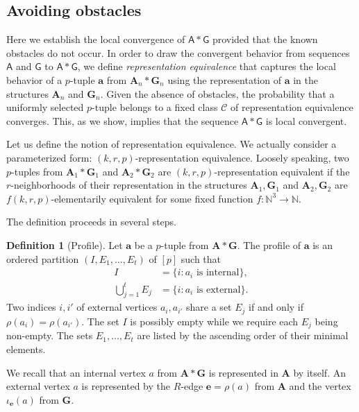 \documentclass[11pt]{article}
\theoremstyle{plain}
\theoremstyle{definition}
\newtheorem{definition}{Definition}
\theoremstyle{remark}
\newcommand{\N}{\mathbb{N}}
\newcommand{\str}[1]{\mathbf{#1}}
\newcommand{\strseq}[1]{{\boldsymbol{\mathsf{#1}}}}
\newcommand{\tpl}[1]{{\bm{#1}}}
\begin{document}
\subsection{Avoiding obstacles}\label{ssec:avoiding_obstacles}

Here we establish the local convergence of $\strseq{A}*\strseq{G}$ provided that the known obstacles do not occur.
In order to draw the convergent behavior from sequences $\strseq{A}$ and $\strseq{G}$ to $\strseq{A}*\strseq{G}$, we define \emph{representation equivalence} that captures the local behavior of a $p$-tuple $\tpl{a}$ from $\str{A}_n * \str{G}_n$ using the representation of $\tpl{a}$ in the structures $\str{A}_n$ and $\str{G}_n$.
Given the absence of obstacles, the probability that a uniformly selected $p$-tuple belongs to a fixed class $\mathcal{C}$ of representation equivalence converges.
This, as we show, implies that the sequence $\strseq{A}*\strseq{G}$ is local convergent.

Let us define the notion of representation equivalence.
We actually consider a parameterized form: $(k,r,p)$-representation equivalence.
Loosely speaking, two $p$-tuples from $\str{A}_1*\str{G}_1$ and $\str{A}_2*\str{G}_2$ are $(k,r,p)$-representation equivalent if the $r$-neighborhoods of their representation in the structures $\str{A}_1, \str{G}_1$ and $\str{A}_2, \str{G}_2$ are $f(k,r,p)$-elementarily equivalent for some fixed function $f: \N^3 \to \N$.

The definition proceeds in several steps.

\begin{definition}[Profile]
    Let $\tpl{a}$ be a $p$-tuple from $\str{A}*\str{G}$.
    The profile of $\tpl{a}$ is an ordered partition $(I, E_1, \dots, E_t)$ of $[p]$ such that
    \begin{align*}
        I                   &= \{i : a_i\text{ is internal}\}
        , \\
        \bigcup_{j=1}^t E_j &= \{i : a_i\text{ is external}\}
        .
    \end{align*}
    Two indices $i,i'$ of external vertices $a_i, a_{i'}$ share a set $E_j$ if and only if $\rho(a_i) = \rho(a_{i'})$.
    The set $I$ is possibly empty while we require each $E_j$ being non-empty.
    The sets $E_1, \dots, E_t$ are listed by the ascending order of their minimal elements.
\end{definition}

We recall that an internal vertex $a$ from $\str{A}*\str{G}$ is represented in $\str{A}$ by itself.
An external vertex $a$ is represented by the $R$-edge $\tpl{e} = \rho(a)$ from $\str{A}$ and the vertex $\iota_{\tpl{e}}(a)$ from $\str{G}$.
\end{document}
